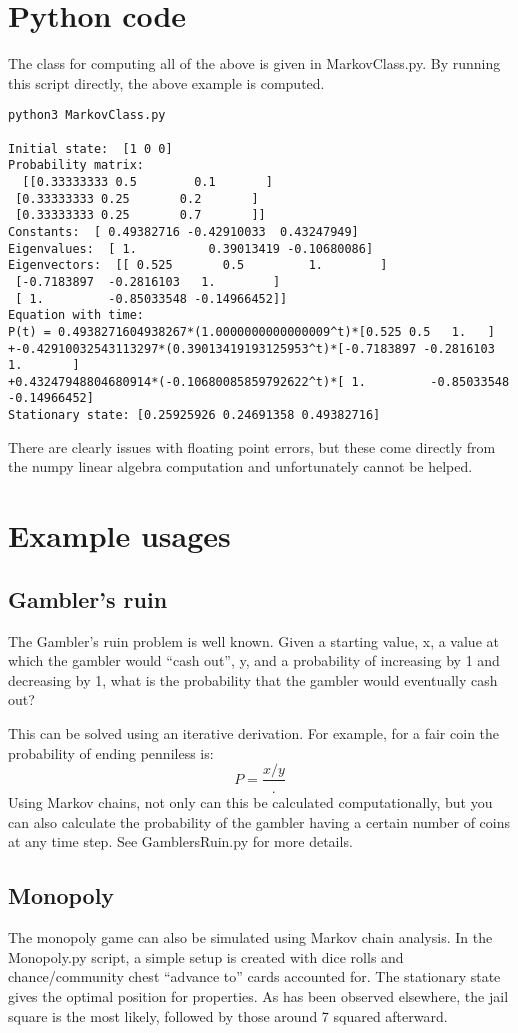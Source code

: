 \documentclass[12pt]{article}
\begin{document}
\section{Python code}
The class for computing all of the above is given in MarkovClass.py.
By running this script directly, the above example is computed.
\begin{verbatim}
python3 MarkovClass.py

Initial state:  [1 0 0]
Probability matrix:
  [[0.33333333 0.5        0.1       ]
 [0.33333333 0.25       0.2       ]
 [0.33333333 0.25       0.7       ]]
Constants:  [ 0.49382716 -0.42910033  0.43247949]
Eigenvalues:  [ 1.          0.39013419 -0.10680086]
Eigenvectors:  [[ 0.525       0.5         1.        ]
 [-0.7183897  -0.2816103   1.        ]
 [ 1.         -0.85033548 -0.14966452]]
Equation with time:
P(t) = 0.4938271604938267*(1.0000000000000009^t)*[0.525 0.5   1.   ] 
+-0.42910032543113297*(0.39013419193125953^t)*[-0.7183897 -0.2816103  1.       ] 
+0.43247948804680914*(-0.10680085859792622^t)*[ 1.         -0.85033548 -0.14966452]
Stationary state: [0.25925926 0.24691358 0.49382716]
\end{verbatim}

There are clearly issues with floating point errors, but these come directly from the numpy linear algebra computation and unfortunately cannot be helped.

\section{Example usages}

\subsection{Gambler's ruin}

The Gambler's ruin problem is well known. 
Given a starting value, x, a value at which the gambler would ``cash out'', y, and a probability of increasing by 1 and decreasing by 1, what is the probability that the gambler would eventually cash out?

This can be solved using an iterative derivation. For example, for a fair coin the probability of ending penniless is:
\begin{equation}
	P = \frac{x/y}.
\end{equation}
Using Markov chains, not only can this be calculated computationally, but you can also calculate the probability of the gambler having a certain number of coins at any time step. See GamblersRuin.py for more details.

\subsection{Monopoly}

The monopoly game can also be simulated using Markov chain analysis. In the Monopoly.py script, a simple setup is created with dice rolls and chance/community chest ``advance to'' cards accounted for. The stationary state gives the optimal position for properties. 
As has been observed elsewhere, the jail square is the most likely, followed by those around 7 squared afterward.
\end{document}

